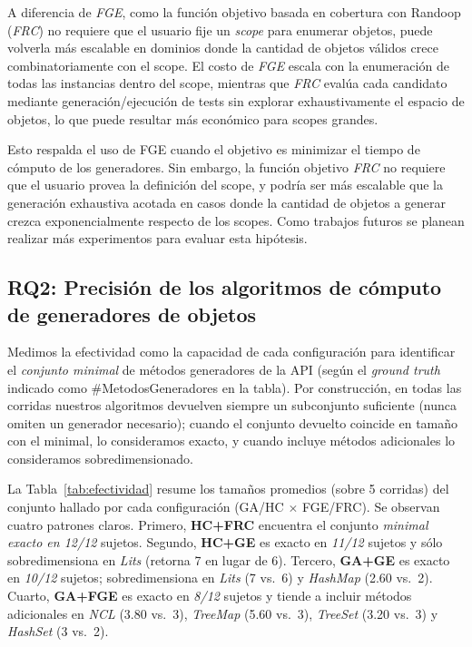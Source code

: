 A diferencia de \emph{FGE}, como la función objetivo basada en cobertura con Randoop
(\emph{FRC}) no requiere que el usuario fije un \emph{scope} para enumerar
objetos, puede volverla más escalable en dominios donde la cantidad de
objetos válidos crece combinatoriamente con el scope. 
El costo de \emph{FGE} escala con la enumeración de todas
las instancias dentro del scope, mientras que \emph{FRC} evalúa cada candidato
mediante generación/ejecución de tests sin explorar exhaustivamente el
espacio de objetos, lo que puede resultar más económico para scopes grandes.

Esto respalda el uso de FGE cuando el objetivo es minimizar el tiempo de cómputo de los generadores.
Sin embargo, la función objetivo \emph{FRC} no requiere que el usuario provea la definición del scope, y
podría ser más escalable que la generación exhaustiva acotada en casos donde
la cantidad de objetos a generar crezca exponencialmente respecto de los scopes. Como trabajos futuros se planean realizar más experimentos 
para evaluar esta hipótesis.



\subsection{RQ2: Precisión de los algoritmos de cómputo de generadores de objetos}
\label{sec:experimentalIdentificacionPrecision}

Medimos la efectividad como la capacidad de cada configuración para identificar
el \emph{conjunto minimal} de métodos generadores de la API (según el
\emph{ground truth} indicado como \#MetodosGeneradores en la tabla). Por construcción, en
todas las corridas nuestros algoritmos devuelven siempre un subconjunto
suficiente (nunca omiten un generador necesario); cuando el conjunto
devuelto coincide en tamaño con el minimal, lo consideramos exacto, y
cuando incluye métodos adicionales lo consideramos sobredimensionado.

La Tabla~\ref{tab:efectividad} resume los tamaños promedios (sobre 5
corridas) del conjunto hallado por cada configuración (GA/HC $\times$ FGE/FRC).
Se observan cuatro patrones claros. Primero, \textbf{HC+FRC} encuentra el conjunto
\emph{minimal exacto en 12/12} sujetos. Segundo, \textbf{HC+GE} es exacto en
\emph{11/12} sujetos y sólo sobredimensiona en \emph{Lits} (retorna 7 en lugar de
6).
Tercero, \textbf{GA+GE} es exacto en \emph{10/12} sujetos; sobredimensiona en
\emph{Lits} (7 vs.\ 6) y \emph{HashMap} (2.60 vs.\ 2). Cuarto, \textbf{GA+FGE} es
exacto en \emph{8/12} sujetos y tiende a incluir métodos adicionales en
\emph{NCL} (3.80 vs.\ 3), \emph{TreeMap} (5.60 vs.\ 3), \emph{TreeSet}
(3.20 vs.\ 3) y \emph{HashSet} (3 vs.\ 2).

